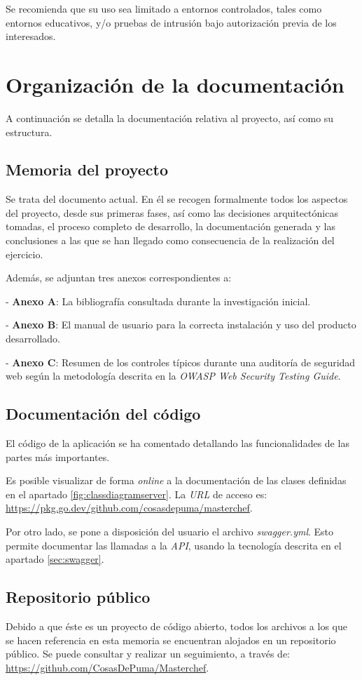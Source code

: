 Se recomienda que su uso sea limitado a entornos controlados, tales como entornos educativos, y/o pruebas de intrusión bajo autorización previa de los interesados.\n


\section{Organización de la documentación} \label{sec:structure}

A continuación se detalla la documentación relativa al proyecto, así como su estructura.\sn

\subsection{Memoria del proyecto} \label{sub:memo}

Se trata del documento actual. En él se recogen formalmente todos los aspectos del proyecto, desde sus primeras fases, así como las decisiones arquitectónicas tomadas, el proceso completo de desarrollo, la documentación generada y las conclusiones a
las que se han llegado como consecuencia de la realización del ejercicio.\sn

Además, se adjuntan tres anexos correspondientes a:\sn

- \textbf{Anexo A}: La bibliografía consultada durante la investigación inicial.\sn

- \textbf{Anexo B}: El manual de usuario para la correcta instalación y uso del producto desarrollado.\sn

- \textbf{Anexo C}: Resumen de los controles típicos durante una auditoría de seguridad web según la metodología descrita en la \textit{OWASP Web Security Testing Guide}\cite{owaspwstg}.\n

\subsection{Documentación del código} \label{sub:codecomments}

El código de la aplicación se ha comentado detallando las funcionalidades de las partes más importantes.\sn

Es posible visualizar de forma \textit{online} a la documentación de las clases definidas en el apartado \ref{fig:classdiagramserver}. La \textit{URL} de acceso es: \url{https://pkg.go.dev/github.com/cosasdepuma/masterchef}.\sn

Por otro lado, se pone a disposición del usuario el archivo \textit{swagger.yml}. Esto permite documentar las llamadas a la \textit{API}, usando la tecnología descrita en el apartado \ref{sec:swagger}.\n

\subsection{Repositorio público} \label{sub:repo}

Debido a que éste es un proyecto de código abierto, todos los archivos a los que se hacen referencia en esta memoria se encuentran alojados en un repositorio público. Se puede consultar y realizar un seguimiento, a través de: \url{https://github.com/CosasDePuma/Masterchef}.